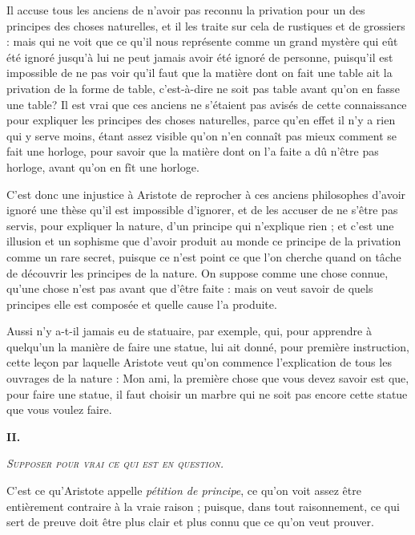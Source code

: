 Il accuse tous les anciens de n'avoir pas reconnu la privation pour un des principes des choses naturelles, et il les traite sur cela de rustiques et de grossiers : mais qui ne voit que ce qu'il nous représente comme un grand mystère qui eût été ignoré jusqu'à lui ne peut jamais avoir été ignoré de personne, puisqu'il est impossible de ne pas voir qu'il faut que la matière dont on fait une table ait la privation de la forme de table, c'est-à-dire ne soit pas table avant qu'on en fasse une table? Il est vrai que ces anciens ne s'étaient pas avisés de cette connaissance pour expliquer les principes des choses naturelles, parce qu'en effet il n'y a rien qui y serve moins, étant assez visible qu'on n'en connaît pas mieux comment se fait une horloge, pour savoir que la matière dont on l'a faite a dû n'être pas horloge, avant qu'on en fît une horloge.

C'est donc une injustice à Aristote de reprocher à ces anciens philosophes d'avoir ignoré une thèse qu'il est impossible d'ignorer, et de les accuser de ne s'être pas servis, pour expliquer la nature, d'un principe qui n'explique rien ; et c'est une illusion et un sophisme que d'avoir produit au monde ce principe de la privation comme un rare secret, puisque ce n'est point ce que l'on cherche quand on tâche de découvrir les principes de la nature. On suppose comme une chose connue, qu'une chose n'est pas avant que d'être faite : mais on veut savoir de quels principes elle est composée et quelle cause l'a produite.

Aussi n'y a-t-il jamais eu de statuaire, par exemple, qui, pour apprendre à quelqu'un la manière de faire une statue, lui ait donné, pour première instruction, cette leçon par laquelle Aristote veut qu'on commence l'explication de tous les ouvrages de la nature : Mon ami, la première chose que vous devez savoir est que, pour faire une statue, il faut choisir un marbre qui ne soit pas encore cette statue que vous voulez faire.

\begin{center}{\bfseries\large II.}\end{center}
\begin{center}\emph{\scshape Supposer pour vrai ce qui est en question.}\end{center}

C'est ce qu'Aristote appelle \emph{pétition de principe}, ce qu'on voit assez être entièrement contraire à la vraie raison ; puisque, dans tout raisonnement, ce qui sert de preuve doit être plus clair et plus connu que ce qu'on veut prouver.

